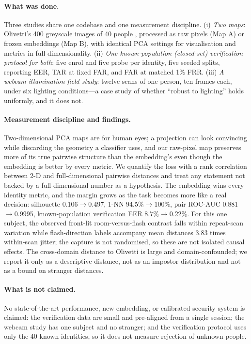 \paragraph{What was done.} Three studies share one codebase and one measurement discipline. (i) \emph{Two maps}: Olivetti's 400 greyscale images of 40 people \citep{samaria1994}, processed as raw pixels (Map A) or frozen embeddings (Map B), with identical PCA settings for visualisation and metrics in full dimensionality. (ii) \emph{One known-population (closed-set) verification protocol for both}: five enrol and five probe per identity, five seeded splits, reporting EER, TAR at fixed FAR, and FAR at matched 1\% FRR. (iii) \emph{A webcam illumination field study}: twelve scans of one person, ten frames each, under six lighting conditions---a case study of whether ``robust to lighting'' holds uniformly, and it does not.

\paragraph{Measurement discipline and findings.} Two-dimensional PCA maps are for human eyes; a projection can look convincing while discarding the geometry a classifier uses, and our raw-pixel map preserves more of its true pairwise structure than the embedding's even though the embedding is better by every metric. We quantify the loss with a rank correlation between 2-D and full-dimensional pairwise distances and treat any statement not backed by a full-dimensional number as a hypothesis. The embedding wins every identity metric, and the margin grows as the task becomes more like a real decision: silhouette 0.106$\to$0.497, 1-NN 94.5\%$\to$100\%, pair ROC-AUC 0.881$\to$0.9995, known-population verification EER 8.7\%$\to$0.22\%. For this one subject, the observed front-lit room-versus-flash contrast falls within repeat-scan variation while flash-direction labels accompany mean distances 3.83 times within-scan jitter; the capture is not randomised, so these are not isolated causal effects. The cross-domain distance to Olivetti is large and domain-confounded; we report it only as a descriptive distance, not as an impostor distribution and not as a bound on stranger distances.

\paragraph{What is not claimed.} No state-of-the-art performance, new embedding, or calibrated security system is claimed: the verification data are small and pre-aligned from a single session; the webcam study has one subject and no stranger; and the verification protocol uses only the 40 known identities, so it does not measure rejection of unknown people.
